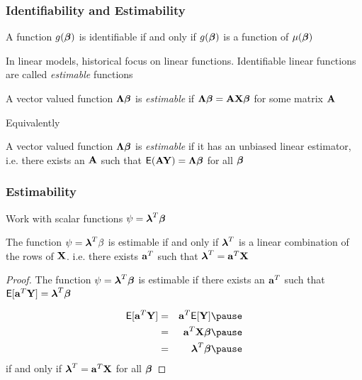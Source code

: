 \documentclass[handout]{beamer}
\begin{document}
\begin{frame}
  \frametitle{Identifiability and Estimability}
  \begin{theorem}
    A function $g(\boldsymbol{\beta})$ is identifiable if and only if $g(\boldsymbol{\beta})$ is a
    function of $\mu(\boldsymbol{\beta})$
  \end{theorem} \pause
In linear models,  historical focus on linear functions.  Identifiable linear
functions are called {\it estimable} functions \pause

\begin{definition}
  A vector valued function $\boldsymbol{\Lambda} \boldsymbol{\beta}$ is {\it estimable} if $\boldsymbol{\Lambda} \boldsymbol{\beta}
  = \mathbf{A} \mathbf{X} \boldsymbol{\beta}$ for some matrix $\mathbf{A}$ \pause
\end{definition} 
Equivalently 

\begin{definition}
  A vector valued function $\boldsymbol{\Lambda} \boldsymbol{\beta}$ is {\it estimable} if it has
  an unbiased linear estimator,   i.e. there exists an $\mathbf{A}$ such that
  $\textsf{E}(\mathbf{A} \mathbf{Y}) = \boldsymbol{\Lambda} \boldsymbol{\beta}$ for all $\boldsymbol{\beta}$
\end{definition}  

\end{frame}
\begin{frame}
  \frametitle{Estimability}
  Work with scalar functions $\psi = \boldsymbol{\lambda}^T \boldsymbol{\beta}$
  \begin{theorem}
    The function $\psi = \boldsymbol{\lambda}^T \beta$ is estimable if and only if
    $\boldsymbol{\lambda}^T$ is a linear combination of the rows of
    $\mathbf{X}$. i.e. there exists $\mathbf{a}^T$ such that  $\boldsymbol{\lambda}^T = \mathbf{a}^T \mathbf{X}$
  \end{theorem} \pause
  \begin{proof}
   The function $\psi= \boldsymbol{\lambda}^T\boldsymbol{\beta}$ is estimable if there exists an $\mathbf{a}^T$ such that
    $\textsf{E}[\mathbf{a}^T\mathbf{Y}] = \boldsymbol{\lambda}^T\boldsymbol{\beta}$ \pause

    \begin{eqnarray*}
      \E[\a^T\Y] & =  &\a^T \E[\Y] \pause\\
                 & = & \a^T \X \b \pause \\
  & =& \lambdab^T \b  \pause
    \end{eqnarray*}
if and only if $\boldsymbol{\lambda}^T = \mathbf{a}^T \mathbf{X}$ for all $\boldsymbol{\beta}$
  \end{proof}
\end{frame}
\end{document}
